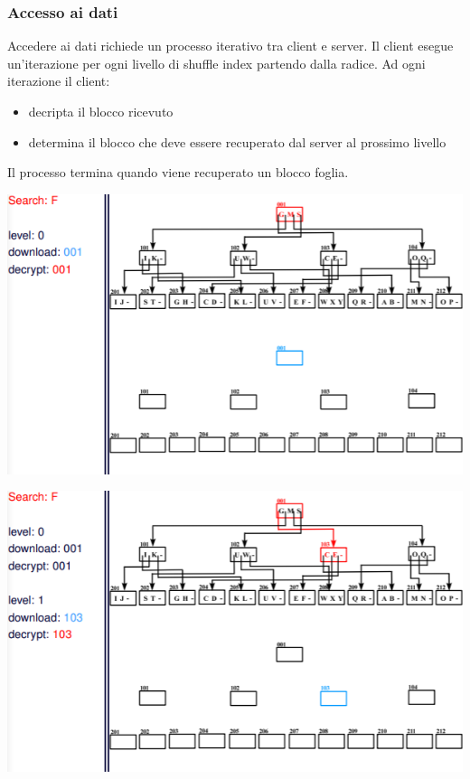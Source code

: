 \subsubsection{Accesso ai dati}
Accedere ai dati richiede un processo iterativo tra client e server. Il client esegue un'iterazione per ogni livello di shuffle index partendo dalla radice. Ad ogni iterazione il client:
\begin{itemize}
    \item decripta il blocco ricevuto
    \item determina il blocco che deve essere recuperato dal server al prossimo livello
\end{itemize}
Il processo termina quando viene recuperato un blocco foglia.
\begin{center}
    \includegraphics[scale=0.8]{img/shuffleaccess.png}
\end{center}
\begin{center}
    \includegraphics[scale=0.8]{img/shuffleaccess1.png}
\end{center}

